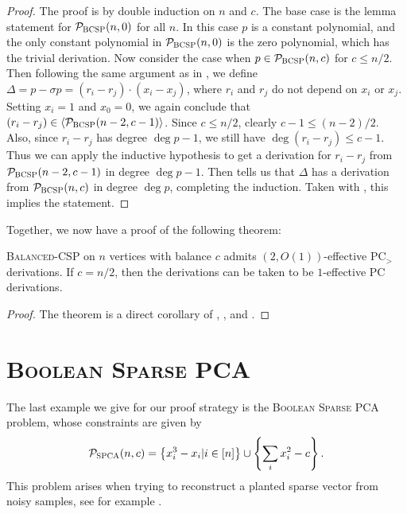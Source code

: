 \begin{proof}
The proof is by double induction on $n$ and $c$. The base case is the lemma statement for $\mathcal P_{\textsc{BCSP}}(n,0)$ for all $n$. In this case $p$ is a constant polynomial, and the only constant polynomial in $\mathcal P_{\textsc{BCSP}}(n,0)$ is the zero polynomial, which has the trivial derivation. Now consider the case when $p \in \mathcal P_{\textsc{BCSP}}(n,c)$ for $c \leq n/2$. Then following the same argument as in , we define $\Delta = p - \sigma p = (r_i - r_j)\cdot (x_i - x_j)$, where $r_i$ and $r_j$ do not depend on $x_i$ or $x_j$. Setting $x_i = 1$ and $x_0 = 0$, we again conclude that $(r_i - r_j) \in \langle \mathcal P_{\textsc{BCSP}}(n-2,c-1) \rangle$. Since $c \leq n/2$, clearly $c-1 \leq (n-2)/2$. Also, since $r_i - r_j$ has degree $\deg p - 1$, we still have $\deg (r_i - r_j) \leq c-1$. Thus we can apply the inductive hypothesis to get a derivation for $r_i - r_j$ from $\mathcal P_{\textsc{BCSP}}(n-2,c-1)$ in degree $\deg p - 1$. Then  tells us that $\Delta$ has a derivation from $\mathcal P_{\textsc{BCSP}}(n,c)$ in degree $\deg p$, completing the induction. Taken with , this implies the statement. 
\end{proof}
Together, we now have a proof of the following theorem:
\begin{theorem}
\textsc{Balanced-CSP} on $n$ vertices with balance $c$ admits $(2,O(1))$-effective PC$_>$ derivations. If $c = n/2$, then the derivations can be taken to be $1$-effective PC derivations.
\end{theorem}
\begin{proof}
The theorem is a direct corollary of , , and .
\end{proof}

\section{\textsc{Boolean Sparse PCA}}
The last example we give for our proof strategy is the \textsc{Boolean Sparse PCA} problem, whose constraints are given by 
\begin{align}
\mathcal P_{\textsc{SPCA}}(n,c) = \left\{x_i^3 - x_i | i \in [n]\right\} \cup \left\{\sum_i x_i^2 - c\right\}.\label{eq:bspca-formulation}
\end{align}
This problem arises when trying to reconstruct a planted sparse vector from noisy samples, see for example \cite{Ma, Wigderson}.

